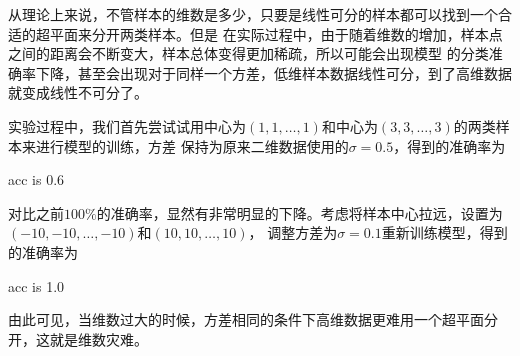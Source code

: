 \documentclass{article}
\begin{document}
 从理论上来说，不管样本的维数是多少，只要是线性可分的样本都可以找到一个合适的超平面来分开两类样本。但是
 在实际过程中，由于随着维数的增加，样本点之间的距离会不断变大，样本总体变得更加稀疏，所以可能会出现模型
 的分类准确率下降，甚至会出现对于同样一个方差，低维样本数据线性可分，到了高维数据就变成线性不可分了。


 实验过程中，我们首先尝试试用中心为$(1,1,\dots,1)$和中心为$(3,3,\dots,3)$的两类样本来进行模型的训练，方差
 保持为原来二维数据使用的$\sigma=0.5$，得到的准确率为
 \begin{python}
    acc is 0.6
 \end{python}
 对比之前$100\%$的准确率，显然有非常明显的下降。考虑将样本中心拉远，设置为$(-10,-10,\dots,-10)$和$(10,10,\dots,10)$，
 调整方差为$\sigma=0.1$重新训练模型，得到的准确率为
 \begin{python}
    acc is 1.0
 \end{python}
 由此可见，当维数过大的时候，方差相同的条件下高维数据更难用一个超平面分开，这就是维数灾难。
\end{document}
